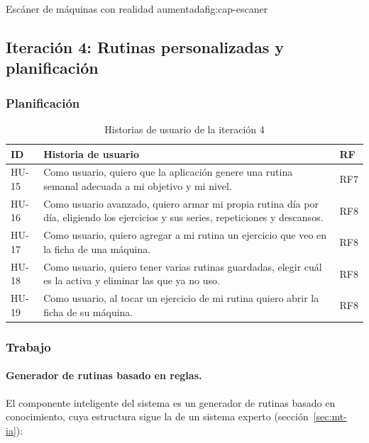   {Escáner de máquinas con realidad aumentada}{fig:cap-escaner}

\subsection{Iteración 4: Rutinas personalizadas y planificación}
\label{subsec:it4}

\subsubsection{Planificación}

\begin{table}[H]
\centering
\caption{Historias de usuario de la iteración 4}
\label{tab:hu-it4}
\begin{tabularx}{\textwidth}{|L{1.2cm}|Y|L{1.5cm}|}
\hline
{} \textbf{ID} & \textbf{Historia de usuario} & \textbf{RF} \\
\hline
HU-15 & Como usuario, quiero que la aplicación genere una rutina semanal
adecuada a mi objetivo y mi nivel. & RF7 \\ \hline
HU-16 & Como usuario avanzado, quiero armar mi propia rutina día por día,
eligiendo los ejercicios y sus series, repeticiones y descansos. & RF8 \\ \hline
HU-17 & Como usuario, quiero agregar a mi rutina un ejercicio que veo en la
ficha de una máquina. & RF8 \\ \hline
HU-18 & Como usuario, quiero tener varias rutinas guardadas, elegir cuál es
la activa y eliminar las que ya no uso. & RF8 \\ \hline
HU-19 & Como usuario, al tocar un ejercicio de mi rutina quiero abrir la
ficha de su máquina. & RF8 \\
\hline
\end{tabularx}
\end{table}

\subsubsection{Trabajo}

\paragraph{Generador de rutinas basado en reglas.} El componente inteligente
del sistema es un generador de rutinas basado en conocimiento, cuya estructura
sigue la de un sistema experto (sección~\ref{sec:mt-ia}):

